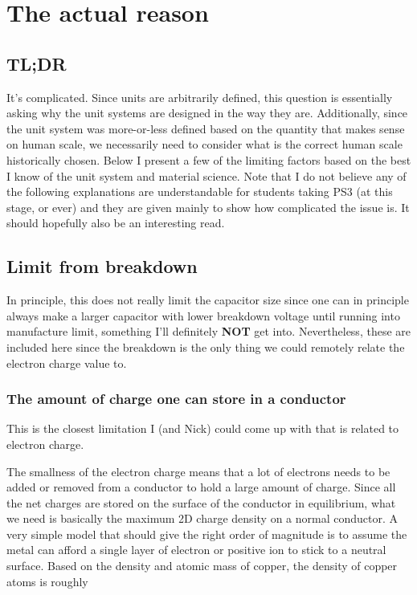 \documentclass[10pt,fleqn]{article}
\begin{document}
\section{The actual reason}

\subsection{TL;DR}

It's complicated. Since units are arbitrarily defined, this question is essentially asking why
the unit systems are designed in the way they are. Additionally, since the unit system
was more-or-less defined based on the quantity that makes sense on human scale,
we necessarily need to consider what is the correct human scale historically chosen.
Below I present a few of the limiting factors based on the best I know of the unit system
and material science.
Note that I do not believe any of the following explanations are understandable for
students taking PS3 (at this stage, or ever) and they are given mainly to show
how complicated the issue is. It should hopefully also be an interesting read.

\subsection{Limit from breakdown}
In principle, this does not really limit the capacitor size since one can in principle always
make a larger capacitor with lower breakdown voltage until running into manufacture limit,
something I'll definitely \textbf{NOT} get into.
Nevertheless, these are included here since the breakdown is the only thing
we could remotely relate the electron charge value to.

\subsubsection{The amount of charge one can store in a conductor}
This is the closest limitation I (and Nick)
could come up with that is related to electron charge.

The smallness of the electron charge means that a lot of electrons needs to be added
or removed from a conductor to hold a large amount of charge. Since all the net charges
are stored on the surface of the conductor in equilibrium, what we need is basically
the maximum 2D charge density on a normal conductor.
A very simple model that should give the right order of magnitude is to assume the metal can
afford a single layer of electron or positive ion to stick to a neutral surface.
Based on the density and atomic mass of copper, the density of copper atoms is roughly
\end{document}
